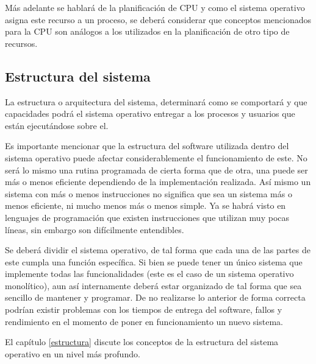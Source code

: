 Más adelante se hablará de la planificación de CPU y como el sistema operativo
asigna este recurso a un proceso, se deberá considerar que conceptos mencionados
para la CPU son análogos a los utilizados en la planificación de otro tipo de
recursos.

\subsection{Estructura del sistema}
La estructura o arquitectura del sistema, determinará como se comportará y que
capacidades podrá el sistema operativo entregar a los procesos y usuarios que
están ejecutándose sobre el.

Es importante mencionar que la estructura del software utilizada dentro del
sistema operativo puede afectar considerablemente el funcionamiento de este. No
será lo mismo una rutina programada de cierta forma que de otra, una puede ser
más o menos eficiente dependiendo de la implementación realizada. Así mismo un
sistema con más o menos instrucciones no significa que sea un sistema más o
menos eficiente, ni mucho menos más o menos simple. Ya se habrá visto en
lenguajes de programación que existen instrucciones que utilizan muy pocas
líneas, sin embargo son difícilmente entendibles.

Se deberá dividir el sistema operativo, de tal forma que cada una de las partes
de este cumpla una función específica. Si bien se puede tener un único sistema
que implemente todas las funcionalidades (este es el caso de un sistema
operativo monolítico), aun así internamente deberá estar organizado de tal forma
que sea sencillo de mantener y programar. De no realizarse lo anterior de forma
correcta podrían existir problemas con los tiempos de entrega del software,
fallos y rendimiento en el momento de poner en funcionamiento un nuevo sistema.

El capítulo \ref{estructura} discute los conceptos de la estructura del sistema
operativo en un nivel más profundo.

